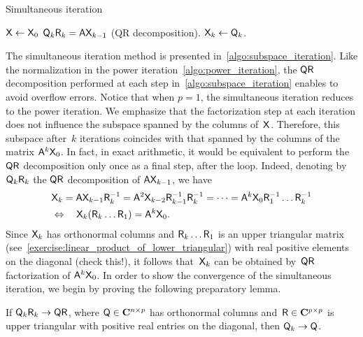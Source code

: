 \begin{algorithm}[ht!]
\caption{Simultaneous iteration}%
\label{algo:subspace_iteration}%
\begin{algorithmic}
\State $\mathsf X \gets \mathsf X_0$
    \State $\mathsf Q_k \mathsf R_k = \mathsf A \mathsf X_{k-1}$ (QR decomposition).
    \State $\mathsf X_k \gets \mathsf Q_k$.
\EndFor
\end{algorithmic}
\end{algorithm}
The simultaneous iteration method is presented in~\cref{algo:subspace_iteration}.
Like the normalization in the power iteration~\cref{algo:power_iteration},
the $\mathsf Q \mathsf R$ decomposition performed at each step in~\cref{algo:subspace_iteration} enables to avoid overflow errors.
Notice that when $p = 1$,
the simultaneous iteration reduces to the power iteration.
We emphasize that
the factorization step at each iteration does not influence the subspace spanned by the columns of~$\mathsf X$.
Therefore, this subspace after~$k$ iterations
coincides with that spanned by the columns of the matrix $\mathsf A^k \mathsf X_0$.
In fact, in exact arithmetic, it would be equivalent to perform the $\mathsf Q \mathsf R$ decomposition only once as a final step,
after the  loop.
Indeed, denoting by $\mathsf Q_k \mathsf R_k$ the $\mathsf Q \mathsf R$ decomposition of $\mathsf A \mathsf X_{k-1}$,
we have
\begin{align*}
    &\mathsf X_k = \mathsf A \mathsf X_{k-1} \mathsf R_k^{-1} = \mathsf A^2 \mathsf X_{k-2} \mathsf R_{k-1}^{-1} \mathsf R_k^{-1} = \dotsb
    = \mathsf A^k \mathsf X_0 \mathsf R_1^{-1} \dotsc \mathsf R_k^{-1} \\
    &\Leftrightarrow \quad \mathsf X_k (\mathsf R_k \dotsc \mathsf R_1) = \mathsf A^k \mathsf X_0.
\end{align*}
Since $\mathsf X_k$ has orthonormal columns and $\mathsf R_k \dotsc \mathsf R_1$ is an upper triangular matrix (see~\cref{exercise:linear_product_of_lower_triangular})
with real positive elements on the diagonal (check this!),
it follows that~$\mathsf X_k$ can be obtained by~$\mathsf Q \mathsf R$ factorization of $\mathsf A^k \mathsf X_0$.
In order to show the convergence of the simultaneous iteration,
we begin by proving the following preparatory lemma.
\begin{lemma}
    \label{lemma:continuity_qr}
    If $\mathsf Q_k \mathsf R_k \to \mathsf Q \mathsf R$,
    where $\mathsf Q \in \mathbf C^{n\times p}$ has orthonormal columns and~$\mathsf R \in \mathbf C^{p\times p}$ is upper triangular with positive real entries on the diagonal,
    then $\mathsf Q_k \to \mathsf Q$.
\end{lemma}
